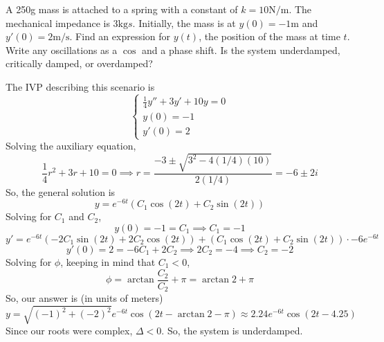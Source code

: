 \begin{example}
	A 250g mass is attached to a spring with a constant of $k = 10\text{N/m}$. The mechanical impedance is 3$\text{kg}{s}$. Initially, the mass is at $y(0)=-1\text{m}$ and $y'(0)=2\text{m/s}$. Find an expression for $y(t)$, the position of the mass at time $t$. Write any oscillations as a $\cos$ and a phase shift. Is the system underdamped, critically damped, or overdamped?
\end{example}
The IVP describing this scenario is
\begin{equation*}
	\begin{cases}
		\frac{1}{4}y'' + 3y' + 10y = 0 \\
		y(0) = -1 \\
		y'(0) = 2
	\end{cases}
\end{equation*}
Solving the auxiliary equation,
\begin{equation*}
	\frac{1}{4}r^2 + 3r + 10 = 0 \implies r = \frac{-3 \pm \sqrt{3^2 - 4(1/4)(10)}}{2(1/4)} = -6 \pm 2i
\end{equation*}
So, the general solution is
\begin{equation*}
	y = e^{-6t}\left(C_1\cos{(2t)} + C_2\sin{(2t)}\right)
\end{equation*}
Solving for $C_1$ and $C_2$,
\begin{equation*}
	y(0) = -1 = C_1 \implies C_1 = -1
\end{equation*}
\begin{equation*}
	y' = e^{-6t}\left(-2C_1\sin{(2t)} + 2C_2\cos{(2t)}\right) + \left(C_1\cos{(2t)} + C_2\sin{(2t)}\right) \cdot -6e^{-6t}
\end{equation*}
\begin{equation*}
	y'(0) = 2 = -6C_1 + 2C_2 \implies 2C_2 = -4 \implies C_2 = -2
\end{equation*}
Solving for $\phi$, keeping in mind that $C_1 < 0$,
\begin{equation*}
	\phi = \arctan{\frac{C_2}{C_2}} + \pi = \arctan{2} + \pi
\end{equation*}
So, our answer is (in units of meters)
\begin{equation*}
	y = \sqrt{(-1)^2 + (-2)^2}e^{-6t}\cos{\left(2t - \arctan{2} - \pi\right)} \approx 2.24e^{-6t}\cos{\left(2t - 4.25\right)}
\end{equation*}
Since our roots were complex, $\Delta < 0$. So, the system is underdamped.